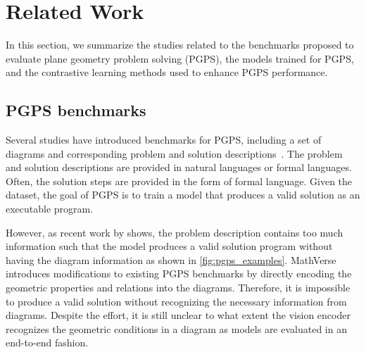 \section{Related Work}

In this section, we summarize the studies related to the benchmarks proposed to evaluate plane geometry problem solving (PGPS), the models trained for PGPS, and the contrastive learning methods used to enhance PGPS performance.

\subsection{PGPS benchmarks}
\label{sec:relatedwork_benchmark}

% 

Several studies have introduced benchmarks for PGPS, including a set of diagrams and corresponding problem and solution descriptions~\citep{geoqa,intergps,pgps,unigeo}. The problem and solution descriptions are provided in natural languages or formal languages. Often, the solution steps are provided in the form of formal language. Given the dataset, the goal of PGPS is to train a model that produces a valid solution as an executable program.
\iffalse
As the problem is multimodal in nature, many works on PGPS combine vision and language models, resulting in a vision-language model. In many architectures, the \emph{vision encoder model} is expected to extract useful information from diagrams and send it to the language model as a form of embedding, and then, the \emph{language model} produces the solution program based on visual embeddings and problem description.
\fi

However, as recent work by \citet{mathverse} shows, the problem description contains too much information such that the model produces a valid solution program without having the diagram information as shown in \cref{fig:pgps_examples}. 
MathVerse~\citep{mathverse} introduces modifications to existing PGPS benchmarks by directly encoding the geometric properties and relations into the diagrams. Therefore, it is impossible to produce a valid solution without recognizing the necessary information from diagrams. Despite the effort, it is still unclear to what extent the vision encoder recognizes the geometric conditions in a diagram as models are evaluated in an end-to-end fashion.

